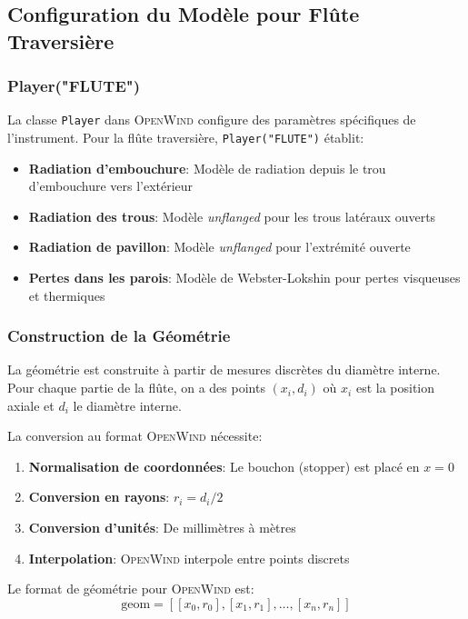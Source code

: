 \documentclass[12pt,a4paper,twocolumn]{article}
\newcommand{\openwind}{\textsc{OpenWind}}
\begin{document}
\subsection{Configuration du Modèle pour Flûte Traversière}

\subsubsection{Player("FLUTE")}

La classe \texttt{Player} dans \openwind{} configure des paramètres spécifiques de l'instrument. Pour la flûte traversière, \texttt{Player("FLUTE")} établit:

\begin{itemize}
    \item \textbf{Radiation d'embouchure}: Modèle de radiation depuis le trou d'embouchure vers l'extérieur
    \item \textbf{Radiation des trous}: Modèle \textit{unflanged} pour les trous latéraux ouverts
    \item \textbf{Radiation de pavillon}: Modèle \textit{unflanged} pour l'extrémité ouverte
    \item \textbf{Pertes dans les parois}: Modèle de Webster-Lokshin pour pertes visqueuses et thermiques
\end{itemize}

\subsubsection{Construction de la Géométrie}

La géométrie est construite à partir de mesures discrètes du diamètre interne. Pour chaque partie de la flûte, on a des points $(x_i, d_i)$ où $x_i$ est la position axiale et $d_i$ le diamètre interne.

La conversion au format \openwind{} nécessite:
\begin{enumerate}
    \item \textbf{Normalisation de coordonnées}: Le bouchon (stopper) est placé en $x=0$
    \item \textbf{Conversion en rayons}: $r_i = d_i/2$
    \item \textbf{Conversion d'unités}: De millimètres à mètres
    \item \textbf{Interpolation}: \openwind{} interpole entre points discrets
\end{enumerate}

Le format de géométrie pour \openwind{} est:
\begin{equation}
\text{geom} = [[x_0, r_0], [x_1, r_1], \ldots, [x_n, r_n]]
\label{eq:geometrie_openwind}
\end{equation}
\end{document}
